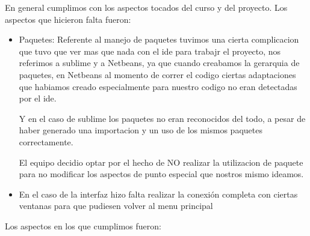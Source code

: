 \documentclass{article}
\begin{document}
En general cumplimos con los aspectos tocados del curso y del proyecto. Los aspectos que hicieron falta fueron:\newline
\begin{itemize}
\item Paquetes:
Referente al manejo de paquetes tuvimos una cierta complicacion que tuvo que ver mas que nada con el ide para trabajr el proyecto, nos referimos a sublime y a Netbeans, ya que cuando creabamos la gerarquia de paquetes, en Netbeans al momento de correr el codigo ciertas adaptaciones que habiamos creado especialmente para nuestro codigo no eran detectadas por el ide.

Y en el caso de sublime los paquetes no eran reconocidos del todo, a pesar de haber generado una importacion y un uso de los mismos paquetes correctamente.

El equipo decidio optar por el hecho de NO realizar la utilizacion de paquete para no modificar los aspectos de punto especial que nostros mismo ideamos.

\item En el caso de la interfaz hizo falta realizar la conexión completa con ciertas ventanas para que pudiesen volver al menu principal
\end{itemize}

\newline Los aspectos en los que cumplimos fueron:
\end{document}
